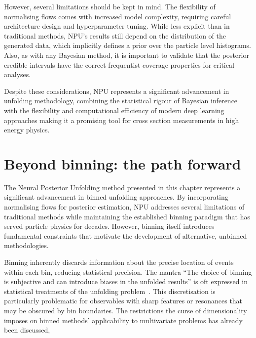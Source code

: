 {    However, several limitations should be kept in mind.
    The flexibility of normalising flows comes with increased model complexity, requiring careful architecture design and hyperparameter tuning.
    While less explicit than in traditional methods, NPU's results still depend on the distribution of the generated data, which implicitly defines a prior over the particle level histograms.
    Also, as with any Bayesian method, it is important to validate that the posterior credible intervals have the correct frequentist coverage properties for critical analyses.
    
    Despite these considerations, NPU represents a significant advancement in unfolding methodology, combining the statistical rigour of Bayesian inference with the flexibility and computational efficiency of modern deep learning approaches making it a promising tool for cross section measurements in high energy physics.

\section{Beyond binning: the path forward}
    The Neural Posterior Unfolding method presented in this chapter represents a significant advancement in binned unfolding approaches.
    By incorporating normalising flows for posterior estimation, NPU addresses several limitations of traditional methods while maintaining the established binning paradigm that has served particle physics for decades.
    However, binning itself introduces fundamental constraints that motivate the development of alternative, unbinned methodologies.

    Binning inherently discards information about the precise location of events within each bin, reducing statistical precision.
    The mantra ``The choice of binning is subjective and can introduce biases in the unfolded results'' is oft expressed in statistical treatments of the unfolding problem~\cite{cowan_survey_2002, cowan_statistics_2021, CowanStatisticalRehovot, Cowan2011AsymptoticPhysics,Tang2017DataMethod, hocker_svd_1996, Gagunashvili2024DataOptimization, CranmerPracticalLHC, StatisticalPhysics, Bohm2025IntroductionPhysicists, gardi_statistics_2015, Adam-Bourdarios2015TheChallenge, cowan_topics_2010}.
    This discretisation is particularly problematic for observables with sharp features or resonances that may be obscured by bin boundaries.
    The restrictions the curse of dimensionality imposes on binned methods' applicability to multivariate problems has already been discussed, 

}
